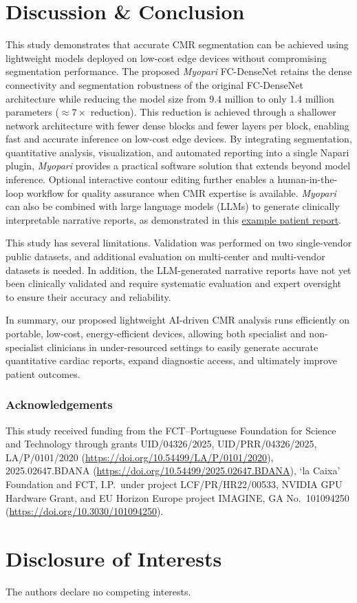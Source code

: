 \documentclass[runningheads]{llncs}
\begin{document}
\section{Discussion \& Conclusion}

This study demonstrates that accurate CMR segmentation can be achieved using lightweight models deployed on low-cost edge devices without compromising segmentation performance. The proposed \textit{Myopari} FC-DenseNet retains the dense connectivity and segmentation robustness of the original FC-DenseNet architecture while reducing the model size from 9.4 million to only 1.4 million parameters ($\approx 7\times$ reduction). This reduction is achieved through a shallower network architecture with fewer dense blocks and fewer layers per block, enabling fast and accurate inference on low-cost edge devices. By integrating segmentation, quantitative analysis, visualization, and automated reporting into a single Napari plugin, \textit{Myopari} provides a practical software solution that extends beyond model inference. Optional interactive contour editing further enables a human-in-the-loop workflow for quality assurance when CMR expertise is available. \textit{Myopari} can also be combined with large language models (LLMs) to generate clinically interpretable narrative reports, as demonstrated in this \href{https://github.com/QBioImaging/myopari/blob/main/reports/myopari_report_patient101_4d.nii.md}{example patient report}.

This study has several limitations. Validation was performed on two single-vendor public datasets, and additional evaluation on multi-center and multi-vendor datasets is needed. In addition, the LLM-generated narrative reports have not yet been clinically validated and require systematic evaluation and expert oversight to ensure their accuracy and reliability.

In summary, our proposed lightweight AI-driven CMR analysis runs efficiently on portable, low-cost, energy-efficient devices, allowing both specialist and non-specialist clinicians in under-resourced settings to easily generate accurate quantitative cardiac reports, expand diagnostic access, and ultimately improve patient outcomes.

\subsubsection{Acknowledgements} 
This study received funding from the FCT--Portuguese Foundation for Science and Technology through grants
UID/04326/2025, \linebreak
UID/PRR/04326/2025,
LA/P/0101/2020
(\url{https://doi.org/10.54499/LA/P/0101/2020}),
2025.02647.BDANA
(\url{https://doi.org/10.54499/2025.02647.BDANA}),
`la Caixa' Foundation and FCT, I.P.\ under project 
LCF/PR/HR22/00533,
NVIDIA GPU Hardware Grant,
and EU Horizon Europe project IMAGINE, GA No.~101094250 (\url{https://doi.org/10.3030/101094250}).
\section*{Disclosure of Interests}
The authors declare no competing interests.




\end{document}
